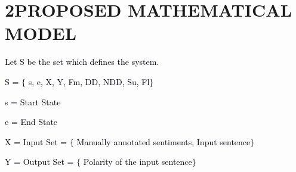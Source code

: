 \documentclass[12pt]{article}
\begin{document}
\vspace{\baselineskip}

\newpage

\vspace{\baselineskip}

\vspace{\baselineskip}

\vspace{\baselineskip}

\vspace{\baselineskip}

\vspace{\baselineskip}

\vspace{\baselineskip}

\vspace{\baselineskip}

\vspace{\baselineskip}

\vspace{\baselineskip}

\vspace{\baselineskip}

\vspace{\baselineskip}

\vspace{\baselineskip}

\section*{2\hspace*{10pt}PROPOSED MATHEMATICAL MODEL}
\textcolor[HTML]{00000A}{Let S be the set which defines the system.}\par

\textcolor[HTML]{00000A}{S = $ \{ $ s, e, X, Y, Fm, DD, NDD, Su, Fl$ \} $ }\par

\textcolor[HTML]{00000A}{s = Start State}\par

\textcolor[HTML]{00000A}{e = End State}\par

\textcolor[HTML]{00000A}{X = Input Set = $ \{ $ Manually annotated sentiments, Input sentence$ \} $ }\par

\textcolor[HTML]{00000A}{Y = Output Set = $ \{ $ Polarity of the input sentence$ \} $ }\par
\end{document}
